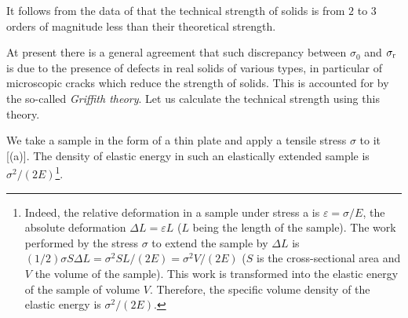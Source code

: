 \begin{table}[!b]
	\renewcommand{\arraystretch}{1.2}
	\caption{}
	\vspace{-0.6cm}
	\label{table:2_5}
	\begin{center}\end{center}
\end{table}

It follows from the data of  that the technical strength of solids is from $2$ to $3$ orders of magnitude less than their theoretical
strength.

At present there is a general agreement that such discrepancy between $\sigma_0$ and $\sigma_{\text{r}}$ is due to the presence of defects in real solids of various types, in particular of microscopic cracks which reduce the strength of solids. This is accounted for by the so-called \textit{Griffith theory}. Let us calculate the technical strength using this theory.

We take a sample in the form of a thin plate and apply a tensile stress $\sigma$ to it [(a)]. The density of elastic energy in such an elastically extended sample is $\sigma^2/(2E)$\footnote{Indeed, the relative deformation in a sample under stress a is $\varepsilon=\sigma/E$, the absolute deformation $\Delta{L}=\varepsilon L$ ($L$ being the length of the sample). The work performed by the stress $\sigma$ to extend the sample by $\Delta{L}$ is $(1/2)\sigma S\Delta{L}=\sigma^2SL/(2E)=\sigma^2V/(2E)$ ($S$ is the cross-sectional area and $V$ the volume of the sample). This work is transformed into the elastic energy of the sample of volume $V$. Therefore, the specific volume density of the elastic energy is $\sigma^2/(2E)$.}.

